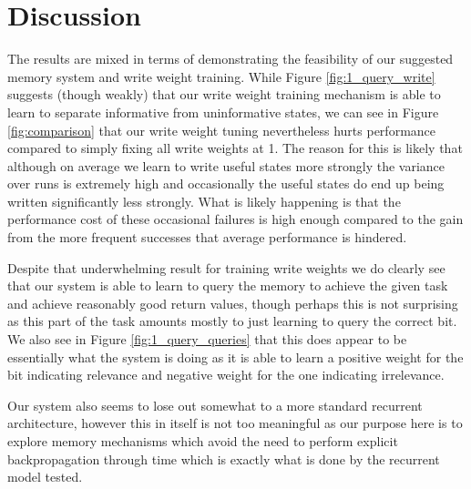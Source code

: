 \documentclass{article}
\begin{document}
\section*{Discussion}
The results are mixed in terms of demonstrating the feasibility of our suggested memory system and write weight training. While Figure \ref{fig:1_query_write} suggests (though weakly) that our write weight training mechanism is able to learn to separate informative from uninformative states, we can see in Figure \ref{fig:comparison} that our write weight tuning nevertheless hurts performance compared to simply fixing all write weights at 1. The reason for this is likely that although on average we learn to write useful states more strongly the variance over runs is extremely high and occasionally the useful states do end up being written significantly less strongly. What is likely happening is that the performance cost of these occasional failures is high enough compared to the gain from the more frequent successes that average performance is hindered.

Despite that underwhelming result for training write weights we do clearly see that our system is able to learn to query the memory to achieve the given task and achieve reasonably good return values, though perhaps this is not surprising as this part of the task amounts mostly to just learning to query the correct bit. We also see in Figure \ref{fig:1_query_queries} that this does appear to be essentially what the system is doing as it is able to learn a positive weight for the bit indicating relevance and negative weight for the one indicating irrelevance.

Our system also seems to lose out somewhat to a more standard recurrent architecture, however this in itself is not too meaningful as our purpose here is to explore memory mechanisms which avoid the need to perform explicit backpropagation through time which is exactly what is done by the recurrent model tested.
\end{document}
